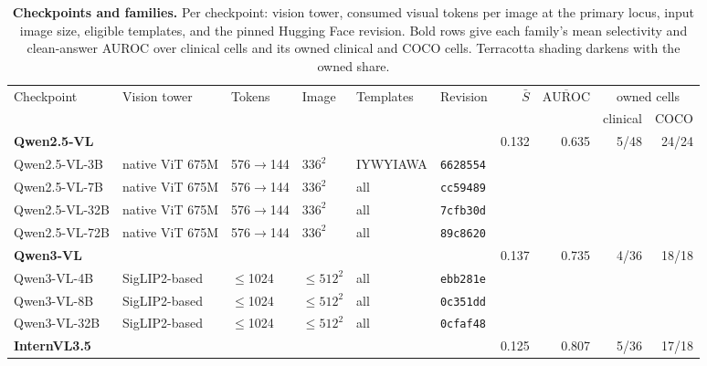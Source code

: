 \documentclass{article}
\begin{document}
\begin{table}[h]
\centering
\scriptsize
\setlength{\tabcolsep}{3pt}

\caption{\textbf{Checkpoints and families.} Per checkpoint: vision tower, consumed visual tokens per image at the primary locus, input image size, eligible templates, and the pinned Hugging Face revision. Bold rows give each family's mean selectivity and clean-answer AUROC over clinical cells and its owned clinical and COCO cells. Terracotta shading darkens with the owned share.}
\label{tab:cf-models}
\begin{tabular}{llllll@{\hspace{8pt}}rrrr}
\toprule
\multirow{2}{*}{Checkpoint} & \multirow{2}{*}{Vision tower} & \multirow{2}{*}{Tokens} & \multirow{2}{*}{Image} & \multirow{2}{*}{Templates} & \multirow{2}{*}{Revision} & \multirow{2}{*}{$\bar S$} & \multirow{2}{*}{$\overline{\mathrm{AUROC}}$} & \multicolumn{2}{c}{owned cells}\\
\cmidrule(lr){9-10}
&  &  &  &  &  &  &  & \multicolumn{1}{c}{clinical} & \multicolumn{1}{c}{COCO}\\
\midrule
\multicolumn{6}{l}{\textbf{Qwen2.5-VL}~\citep{bai2025qwen25vl}} & 0.132 & 0.635 & \cellcolor{cfTerra2}5/48 & \cellcolor{cfTerra4}24/24 \\
\quad Qwen2.5-VL-3B & native ViT 675M & 576$\to$144 & $336^2$ & IYWYIAWA & \texttt{6628554} & & & & \\
\quad Qwen2.5-VL-7B & native ViT 675M & 576$\to$144 & $336^2$ & all & \texttt{cc59489} & & & & \\
\quad Qwen2.5-VL-32B & native ViT 675M & 576$\to$144 & $336^2$ & all & \texttt{7cfb30d} & & & & \\
\quad Qwen2.5-VL-72B & native ViT 675M & 576$\to$144 & $336^2$ & all & \texttt{89c8620} & & & & \\
\midrule
\multicolumn{6}{l}{\textbf{Qwen3-VL}~\citep{qwen2025qwen3vl}} & 0.137 & 0.735 & \cellcolor{cfTerra2}4/36 & \cellcolor{cfTerra4}18/18 \\
\quad Qwen3-VL-4B & SigLIP2-based & $\leq$1024 & $\leq 512^2$ & all & \texttt{ebb281e} & & & & \\
\quad Qwen3-VL-8B & SigLIP2-based & $\leq$1024 & $\leq 512^2$ & all & \texttt{0c351dd} & & & & \\
\quad Qwen3-VL-32B & SigLIP2-based & $\leq$1024 & $\leq 512^2$ & all & \texttt{0cfaf48} & & & & \\
\midrule
\multicolumn{6}{l}{\textbf{InternVL3.5}~\citep{wang2025internvl35}} & 0.125 & 0.807 & \cellcolor{cfTerra2}5/36 & \cellcolor{cfTerra4}17/18 \\

\end{tabular}
\end{table}
\end{document}
